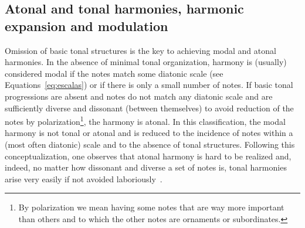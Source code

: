 \subsection{Atonal and tonal harmonies, harmonic expansion and modulation}\label{subsec:harmonia}
Omission of basic tonal structures is the key to achieving modal and atonal harmonies. In the absence of minimal tonal organization,
harmony is (usually) considered modal if the notes match some diatonic scale (see Equations~\ref{eq:escalas}) or if there is only a small number of notes. If basic tonal progressions are absent and notes do not match any diatonic scale and are sufficiently diverse and dissonant (between themselves) to avoid reduction of the notes by polarization\footnote{By polarization we mean having some notes that are way more important than others and to which the other notes are ornaments or subordinates.}, the harmony is atonal. In this classification, the modal harmony is not tonal or atonal and is reduced to the incidence of notes within a (most often diatonic) scale and to the absence of tonal structures. Following this conceptualization, one observes that atonal harmony is hard to be realized and, indeed, no matter how dissonant and diverse
a set of notes is, tonal harmonies arise very easily if not avoided laboriously~\cite{harmEXT}.

